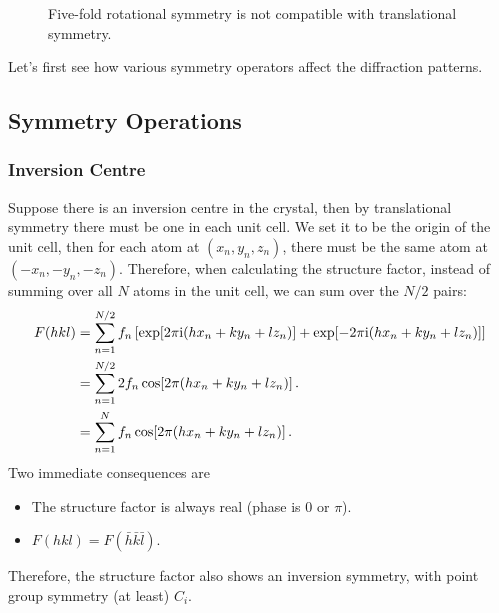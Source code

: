 \documentclass{article}
\theoremstyle{plain}\theoremheaderfont{\normalfont\itshape}\theorembodyfont{\rmfamily}\theoremseparator{.}\newtheorem*{rem}{Remark}\newtheorem*{ex}{Example}\newtheorem*{proof}{Proof}\newtheorem*{altp}{Alternative proof}
\theoremstyle{plain}\theoremheaderfont{\normalfont\bfseries}\theorembodyfont{\rmfamily}\theoremseparator{.}\newtheorem{thm}{Theorem}[section]\newtheorem{lem}[thm]{Lemma}\newtheorem{prop}[thm]{Proposition}\newtheorem*{cor}{Corollary}\newtheorem{defn}[thm]{Definition}\newtheorem{clm}[thm]{Claim}\newtheorem{clminproof}{Claim}\newtheorem*{law}{Law}\newtheorem{pos}[thm]{Postulate}
\theoremstyle{break}\theoremheaderfont{\normalfont\itshape}\theorembodyfont{\rmfamily}\theoremseparator{.\medskip}\newtheorem*{proofskip}{Proof}\newtheorem*{exs}{Examples}\newtheorem*{rems}{Remarks}
\theoremstyle{break}\theoremheaderfont{\normalfont\bfseries}\theorembodyfont{\rmfamily}\theoremseparator{.\medskip}\newtheorem{lemskip}[thm]{Lemma}\newtheorem{defnskip}[thm]{Definition}\newtheorem{propskip}[thm]{Proposition}\newtheorem{thmskip}[thm]{Theorem}
\numberwithin{equation}{section}
\newcommand{\ii}{\mathrm{i}}
\begin{document}
    \begin{figure}[ht!]
        \centering
        \caption{Five-fold rotational symmetry is not compatible with translational symmetry.}
    \end{figure}

    Let's first see how various symmetry operators affect the diffraction patterns.
    \subsection{Symmetry Operations}
    \subsubsection{Inversion Centre}
    Suppose there is an inversion centre in the crystal, then by translational symmetry there must be one in each unit cell. We set it to be the origin of the unit cell, then for each atom at \((x_n,y_n,z_n)\), there must be the same atom at \((-x_n,-y_n,-z_n)\). Therefore, when calculating the structure factor, instead of summing over all \(N\) atoms in the unit cell, we can sum over the \(N/2\) pairs:
    \begin{align}
        F(hkl)&=\sum_{n=1}^{N/2}f_n\left[\exp[2\pi \ii(hx_n+ky_n+lz_n)]+\exp[-2\pi \ii(hx_n+ky_n+lz_n)]\right]\notag \\
        &=\sum_{n=1}^{N/2}2f_n\cos[2\pi (hx_n+ky_n+lz_n)]\,.\notag \\
        &=\sum_{n=1}^{N}f_n\cos[2\pi (hx_n+ky_n+lz_n)]\,.
    \end{align}
    Two immediate consequences are
    \begin{itemize}[topsep=0pt]
        \item The structure factor is always real (phase is \(0\) or \(\pi\)).
        \item \(F(hkl)=F(\bar{h}\bar{k}\bar{l})\).
    \end{itemize}
    Therefore, the structure factor also shows an inversion symmetry, with point group symmetry (at least) \(C_i\).
\end{document}
